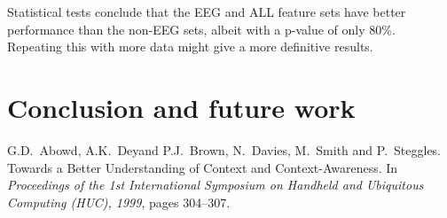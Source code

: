 \documentclass[12pt,journal,compsoc]{IEEEtran}
\begin{document}
Statistical tests conclude that the EEG and ALL feature sets have better performance than the non-EEG sets, albeit with a p-value of only 80\%. Repeating this with more data might give a more definitive results. 



\section{Conclusion and future work} \label{conclusion}


\begin{thebibliography}{1}

G.D.~Abowd, A.K.~Deyand P.J.~Brown, N.~Davies, M.~Smith and P.~Steggles.
\newblock Towards a Better Understanding of Context and Context-Awareness.
\newblock In {\em Proceedings of the 1st International Symposium on Handheld and Ubiquitous Computing (HUC),
	1999}, pages 304--307.

\end{thebibliography}
\end{document}
